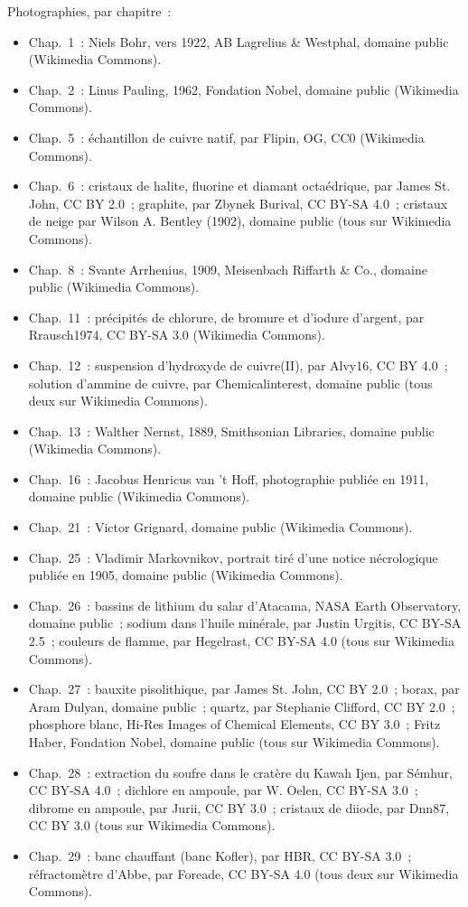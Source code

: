 \bigskip
\noindent Photographies, par chapitre~:
\begin{itemize}\small
  \item Chap.~1~: Niels Bohr, vers 1922, AB Lagrelius \& Westphal,
        domaine public (Wikimedia Commons).
  \item Chap.~2~: Linus Pauling, 1962, Fondation Nobel, domaine public
        (Wikimedia Commons).
  \item Chap.~5~: échantillon de cuivre natif, par Flipin, OG, CC0
        (Wikimedia Commons).
  \item Chap.~6~: cristaux de halite, fluorine et diamant octaédrique,
        par James St. John, CC BY 2.0~; graphite, par Zbynek Burival,
        CC BY-SA 4.0~; cristaux de neige par Wilson A. Bentley (1902),
        domaine public (tous sur Wikimedia Commons).
  \item Chap.~8~: Svante Arrhenius, 1909, Meisenbach Riffarth \& Co.,
        domaine public (Wikimedia Commons).
  \item Chap.~11~: précipités de chlorure, de bromure et d'iodure
        d'argent, par Rrausch1974, CC BY-SA 3.0 (Wikimedia Commons).
  \item Chap.~12~: suspension d'hydroxyde de cuivre(II), par Alvy16,
        CC BY 4.0~; solution d'ammine de cuivre, par Chemicalinterest,
        domaine public (tous deux sur Wikimedia Commons).
  \item Chap.~13~: Walther Nernst, 1889, Smithsonian Libraries, domaine
        public (Wikimedia Commons).
  \item Chap.~16~: Jacobus Henricus van 't Hoff, photographie publiée en
        1911, domaine public (Wikimedia Commons).
  \item Chap.~21~: Victor Grignard, domaine public (Wikimedia Commons).
  \item Chap.~25~: Vladimir Markovnikov, portrait tiré d'une notice
        nécrologique publiée en 1905, domaine public (Wikimedia Commons).
  \item Chap.~26~: bassins de lithium du salar d'Atacama, NASA Earth
        Observatory, domaine public~; sodium dans l'huile minérale, par
        Justin Urgitis, CC BY-SA 2.5~; couleurs de flamme, par Hegelrast,
        CC BY-SA 4.0 (tous sur Wikimedia Commons).
  \item Chap.~27~: bauxite pisolithique, par James St. John, CC BY 2.0~;
        borax, par Aram Dulyan, domaine public~; quartz, par Stephanie
        Clifford, CC BY 2.0~; phosphore blanc, Hi-Res Images of Chemical
        Elements, CC BY 3.0~; Fritz Haber, Fondation Nobel, domaine public
        (tous sur Wikimedia Commons).
  \item Chap.~28~: extraction du soufre dans le cratère du Kawah Ijen,
        par Sémhur, CC BY-SA 4.0~; dichlore en ampoule, par W. Oelen,
        CC BY-SA 3.0~; dibrome en ampoule, par Jurii, CC BY 3.0~;
        cristaux de diiode, par Dnn87, CC BY 3.0 (tous sur Wikimedia
        Commons).
  \item Chap.~29~: banc chauffant (banc Kofler), par HBR, CC BY-SA 3.0~;
        réfractomètre d'Abbe, par Foreade, CC BY-SA 4.0 (tous deux sur
        Wikimedia Commons).
\end{itemize}
\clearpage
